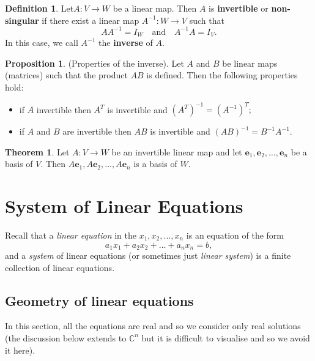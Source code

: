 \documentclass[12pt, a4paper]{article}
\theoremstyle{definition}
\newtheorem{definition}{Definition}[section]
\newtheorem{theorem}{Theorem}[section]
\newtheorem{proposition}{Proposition}
\theoremstyle{plain}
\newcommand{\bb}[1]{\mathbb{#1}}
\newcommand{\vect}[1]{\mathbf{#1}}
\begin{document}
\begin{definition} Let$A : V \rightarrow W$ be a linear map. Then $A$ is \textbf{invertible} or \textbf{non-singular} if there exist a linear map $A^{-1} : W \rightarrow V$ such that $$AA^{-1}=I_W \quad \text{and} \quad A^{-1}A=I_V.$$ In this case, we call $A^{-1}$ the \textbf{inverse} of $A.$ \end{definition}

\begin{proposition}(Properties of the inverse). Let $A$ and $B$ be linear maps (matrices) such that the product $AB$ is defined. Then the following properties hold: 

\begin{itemize}

	\item if $A$ invertible then $A^T$ is invertible and $(A^T)^{-1}= (A^{-1})^T;$

	\item if $A$ and $B$ are invertible then $AB$ is invertible and $(AB)^{-1} = B^{-1}A^{-1}.$

\end{itemize}
\end{proposition}

\begin{theorem} Let $A : V \rightarrow W$ be an invertible linear map and let $\vect{e}_1,\vect{e}_2,\ldots,\vect{e}_n$ be a basis of $V.$ Then $A\vect{e}_1,A\vect{e}_2,\ldots,A\vect{e}_n$ is a basis of $W.$ \end{theorem}

\section{System of Linear Equations}

Recall that a \textit{linear equation} in the  $x_1, x_2,\ldots, x_n$ is an equation of the form $$a_1x_1+a_2x_2+\ldots+a_nx_n=b,$$ and a \textit{system} of linear equations (or sometimes just \textit{linear system}) is a finite collection of linear equations.

\subsection{Geometry of linear equations}

In this section, all the equations are real and so we consider only real solutions (the discussion below extends to $\bb{C}^n$ but it is difficult to visualise and so we avoid it here).
\end{document}
